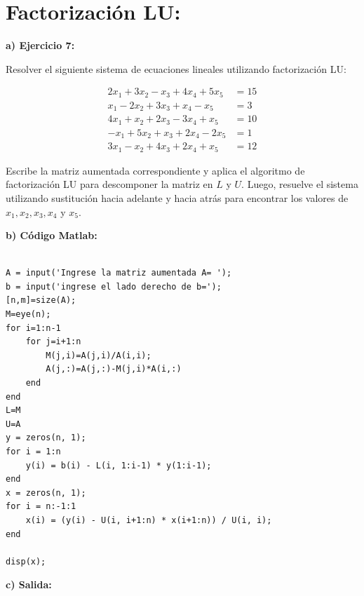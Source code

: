 \documentclass[12pt,a4paper,twoside]{article}  %
\begin{document}
\section{Factorización LU: }

\textbf{a) Ejercicio 7: }

Resolver el siguiente sistema de ecuaciones lineales utilizando factorización LU:

\[
\begin{aligned}
2x_1 + 3x_2 - x_3 + 4x_4 + 5x_5 &= 15 \\
x_1 - 2x_2 + 3x_3 + x_4 - x_5 &= 3 \\
4x_1 + x_2 + 2x_3 -  3x_4 + x_5 &= 10 \\
-x_1 +  5x_2 + x_3 + 2x_4 - 2x_5 &= 1 \\
3x_1 - x_2 + 4x_3 + 2x_4 + x_5 &= 12
\end{aligned}
\]

Escribe la matriz aumentada correspondiente y aplica el algoritmo de factorización LU para descomponer la matriz en \( L \) y \( U \). Luego, resuelve el sistema utilizando sustitución hacia adelante y hacia atrás para encontrar los valores de \( x_1, x_2, x_3, x_4 \) y \( x_5 \).




\textbf{b) Código Matlab:}

\begin{lstlisting}

A = input('Ingrese la matriz aumentada A= ');
b = input('ingrese el lado derecho de b=');
[n,m]=size(A);
M=eye(n);
for i=1:n-1
    for j=i+1:n
        M(j,i)=A(j,i)/A(i,i);
        A(j,:)=A(j,:)-M(j,i)*A(i,:)
    end
end
L=M
U=A
y = zeros(n, 1);
for i = 1:n
    y(i) = b(i) - L(i, 1:i-1) * y(1:i-1);
end
x = zeros(n, 1);
for i = n:-1:1
    x(i) = (y(i) - U(i, i+1:n) * x(i+1:n)) / U(i, i); 
end

disp(x);

\end{lstlisting}

\textbf{c) Salida:}
\end{document}
